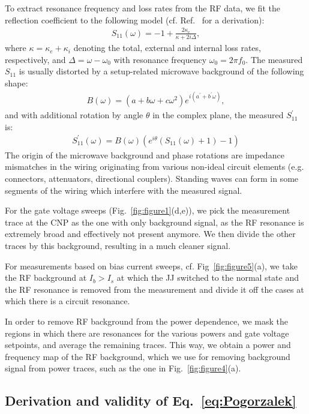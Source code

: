 To extract resonance frequency and loss rates from the RF data, we fit the reflection coefficient to the following model (cf. Ref.~\cite{bosmanBroadbandArchitectureGalvanically2015c} for a derivation):
%
\begin{align}
S_{11}(\omega) = -1+\frac{2\kappa_e}{\kappa+2i\Delta},
\end{align}
%
where $\kappa=\kappa_e+\kappa_i$ denoting the total, external and internal loss rates, respectively, and $\Delta=\omega-\omega_0$ with resonance frequency $\omega_0=2\pi f_0$.
%
The measured $S_{11}$ is usually distorted by a setup-related microwave background of the following shape:
\begin{align}
B(\omega) = \left(a+b\omega+c\omega^2\right)e^{i\left(a^\prime+b^\prime\omega\right)},
\end{align}
%
and with additional rotation by angle $\theta$ in the complex plane, the measured $S_{11}^\prime$ is:
\begin{align}
S_{11}^\prime(\omega)=B(\omega)\left(e^{i\theta}\left(S_{11}(\omega)+1\right)-1\right)
\end{align}
%
The origin of the microwave background and phase rotations are impedance mismatches in the wiring originating from various non-ideal circuit elements (e.g. connectors, attenuators, directional couplers).
%
Standing waves can form in some segments of the wiring which interfere with the measured signal.

For the gate voltage sweeps (Fig.~\ref{fig:figure1}(d,e)), we pick the measurement trace at the CNP as the one with only background signal, as the RF resonance is extremely broad and effectively not present anymore.
%
We then divide the other traces by this background, resulting in a much cleaner signal.

For measurements based on bias current sweeps, cf. Fig~\ref{fig:figure5}(a), we take the RF background at $I_b>I_s$ at which the JJ switched to the normal state and the RF resonance is removed from the measurement and divide it off the cases at which there is a circuit resonance.

In order to remove RF background from the power dependence, we mask the regions in which there are resonances for the various powers and gate voltage setpoints, and average the remaining traces.
%
This way, we obtain a power and frequency map of the RF background, which we use for removing background signal from power traces, such as the one in Fig.~\ref{fig:figure4}(a).

\subsection{Derivation and validity of Eq.~\ref{eq:Pogorzalek}}\label{sec:validity}

